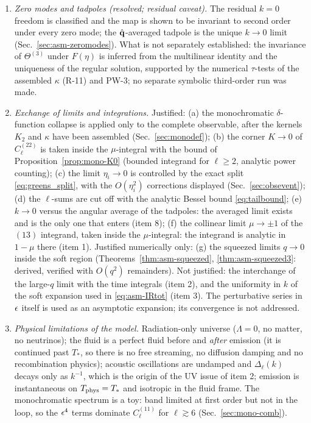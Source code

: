 \begin{enumerate}
\item \emph{Zero modes and tadpoles (resolved; residual caveat).}  The residual $k=0$ freedom is classified and the map is shown to be
invariant to second order under every zero mode; the $\hat{\mathbf q}$-averaged tadpole is the unique $k\to0$ limit (Sec.~\ref{sec:asm-zeromodes}).  What is not
separately established: the invariance of $\Theta^{(3)}$ under $F(\eta)$ is inferred from the multilinear identity and the uniqueness of the regular
solution, supported by the numerical $\tau$-tests of the assembled $\kappa$ (R-11) and PW-3; no separate symbolic third-order run was made.
\item \emph{Exchange of limits and integrations.}  Justified: (a) the monochromatic $\delta$-function collapse is applied only to the complete
observable, after the kernels $K_2$ and $\kappa$ have been assembled (Sec.~\ref{sec:monodef}); (b) the corner $K\to0$ of $C^{(22)}_\ell$ is taken
inside the $\mu$-integral with the bound of Proposition~\ref{prop:mono-K0} (bounded integrand for $\ell\ge2$, analytic power counting); (c) the
limit $\eta_i\to0$ is controlled by the exact split \eqref{eq:greens_split}, with the $O(\eta_i^2)$ corrections displayed (Sec.~\ref{sec:obsevent});
(d) the $\ell$-sums are cut off with the analytic Bessel bound \eqref{eq:tailbound}; (e) $k\to0$ versus the angular average of the tadpoles: the
averaged limit exists and is the only one that enters (item 8); (f) the collinear limit $\mu\to\pm1$ of the $(13)$ integrand, taken inside the
$\mu$-integral: the integrand is analytic in $1-\mu$ there (item 1).  Justified numerically only: (g) the squeezed limits $q\to0$ inside the soft region
(Theorems~\ref{thm:asm-squeezed}, \ref{thm:asm-squeezed3}: derived, verified with $O(q^2)$ remainders).  Not justified: the interchange of the
large-$q$ limit with the time integrals (item 2), and the uniformity in $k$ of the soft expansion used in \eqref{eq:asm-IRtot} (item 3).  The
perturbative series in $\epsilon$ itself is used as an asymptotic expansion; its convergence is not addressed.
\item \emph{Physical limitations of the model.}  Radiation-only universe ($\Lambda=0$, no matter, no neutrinos); the fluid is a perfect fluid
before and \emph{after} emission (it is continued past $T_*$, so there is no free streaming, no diffusion damping and no recombination physics);
acoustic oscillations are undamped and $\Delta_\ell(k)$ decays only as $k^{-1}$, which is the origin of the UV issue of item 2; emission is
instantaneous on $T_{\rm phys}=T_*$ and isotropic in the fluid frame.  The monochromatic spectrum is a toy: band limited at first order but not
in the loop, so the $\epsilon^4$ terms dominate $C^{(11)}_\ell$ for $\ell\gtrsim6$ (Sec.~\ref{sec:mono-comb}).
\end{enumerate}
